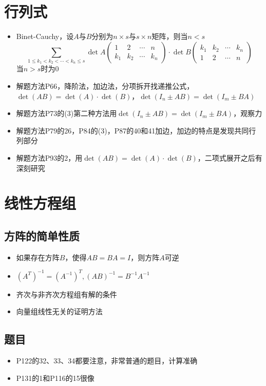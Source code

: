 \documentclass[UTF8]{ctexart}
\begin{document}
\section{行列式}
\begin{itemize}
\item Binet-Cauchy，设$A$与$B$分别为$n\times s$与$s\times n$矩阵，则当$n<s$
\[
\sum_{1\leq k_1<k_2<\cdots<k_n\leq s}\det A\left(
\begin{array}{cccc}
1 & 2 & \cdots & n\\
k_1 & k_2 & \cdots & k_n
\end{array}
\right)\cdot \det B\left(
\begin{array}{cccc}
k_1 & k_2 & \cdots & k_n\\
1 & 2 & \cdots & n
\end{array}
\right)
\]
当$n>s$时为0

\item 解题方法P66，降阶法，加边法，分项拆开找递推公式，$\det(AB)=\det(A)\cdot\det(B)$，$\det(I_n\pm AB)=\det(I_m\pm BA)$

\item 解题方法P73的(3)第二种方法用$\det(I_n\pm AB)=\det(I_m\pm BA)$，观察力

\item 解题方法P79的26，P84的(3)，P87的40和41加边，加边的特点是发现共同行列部分

\item 解题方法P93的2，用$\det(AB)=\det(A)\cdot\det(B)$，二项式展开之后有深刻研究

\end{itemize}

\section{线性方程组}
\subsection{方阵的简单性质}
\begin{itemize}
\item 如果存在方阵$B$，使得$AB=BA=I$，则方阵$A$可逆
\item $(A^T)^{-1}=(A^{-1})^T,(AB)^{-1}=B^{-1}A^{-1}$
\item 齐次与非齐次方程组有解的条件
\item 向量组线性无关的证明方法
\end{itemize}
\subsection{题目}
\begin{itemize}
\item P122的32、33、34都要注意，非常普通的题目，计算准确
\item P131的1和P116的15很像
\end{itemize}
\end{document}
